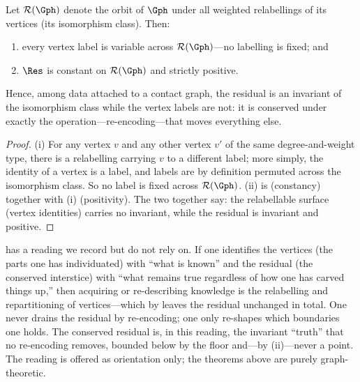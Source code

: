 \begin{theorem}
\label{thm:residual-conserved}
Let $\mathcal{R}(\Gph)$ denote the orbit of $\Gph$ under all weighted
relabellings of its vertices \textup{(}its isomorphism class\textup{)}. Then:
\begin{enumerate}[label=\textup{(\roman*)},leftmargin=2.2em]
\item every vertex label is variable across $\mathcal{R}(\Gph)$---no labelling is
fixed; and
\item $\Res$ is constant on $\mathcal{R}(\Gph)$ and strictly positive.
\end{enumerate}
Hence, among data attached to a contact graph, the residual is an invariant of
the isomorphism class while the vertex labels are not: it is conserved under
exactly the operation---re-encoding---that moves everything else.
\end{theorem}

\begin{proof}
(i) For any vertex $v$ and any other vertex $v'$ of the same degree-and-weight
type, there is a relabelling carrying $v$ to a different label; more simply, the
identity of a vertex is a label, and labels are by definition permuted across the
isomorphism class. So no label is fixed across $\mathcal{R}(\Gph)$. (ii) is
 (constancy) together with
(i) (positivity). The two together say: the
relabellable surface (vertex identities) carries no invariant, while the residual
is invariant and positive.
\end{proof}

\begin{remark}
\label{rem:repacking}
 has a reading we record but do not rely on. If one
identifies the vertices (the parts one has individuated) with ``what is known''
and the residual (the conserved interstice) with ``what remains true regardless
of how one has carved things up,'' then acquiring or re-describing knowledge is
the relabelling and repartitioning of vertices---which by
 leaves the residual unchanged in total. One never
drains the residual by re-encoding; one only re-shapes which boundaries one
holds. The conserved residual is, in this reading, the invariant ``truth'' that
no re-encoding removes, bounded below by the floor and---by
(ii)---never a point. The reading is offered as
orientation only; the theorems above are purely graph-theoretic.
\end{remark}

